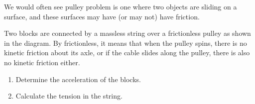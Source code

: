 We would often see pulley problem is one where two objects are sliding on a
surface, and these surfaces may have (or may not) have friction.
\begin{example}
  Two blocks are connected by a massless string over a frictionless pulley as
  shown in the diagram. By frictionless, it means that when the pulley spins,
  there is no kinetic friction about its axle, or if the cable slides along the
  pulley, there is also no kinetic friction either.
  \begin{center}
  \end{center}
  \begin{enumerate}[label=(\alph*),itemsep=6pt]
  \item Determine the acceleration of the blocks.
  \item Calculate the tension in the string.
  \end{enumerate}
\end{example}
